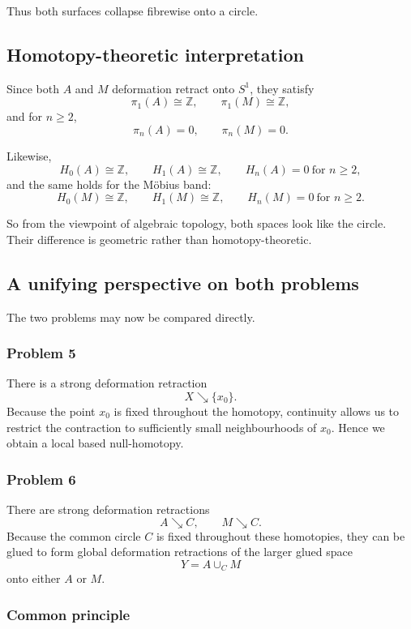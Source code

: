 \documentclass[12pt,a4paper]{article}
\theoremstyle{notespace}
\begin{document}
Thus both surfaces collapse fibrewise onto a circle.

\subsection{Homotopy-theoretic interpretation}

Since both \(A\) and \(M\) deformation retract onto \(S^1\), they satisfy
\[
\pi_1(A)\cong \mathbb{Z},
\qquad
\pi_1(M)\cong \mathbb{Z},
\]
and for \(n\geq 2\),
\[
\pi_n(A)=0,
\qquad
\pi_n(M)=0.
\]

Likewise,
\[
H_0(A)\cong \mathbb{Z},
\qquad
H_1(A)\cong \mathbb{Z},
\qquad
H_n(A)=0\ \text{for }n\geq 2,
\]
and the same holds for the Möbius band:
\[
H_0(M)\cong \mathbb{Z},
\qquad
H_1(M)\cong \mathbb{Z},
\qquad
H_n(M)=0\ \text{for }n\geq 2.
\]

So from the viewpoint of algebraic topology, both spaces look like the circle. Their difference is geometric rather than homotopy-theoretic.

\subsection{A unifying perspective on both problems}

The two problems may now be compared directly.

\subsubsection{Problem 5}

There is a strong deformation retraction
\[
X\searrow \{x_0\}.
\]
Because the point \(x_0\) is fixed throughout the homotopy, continuity allows us to restrict the contraction to sufficiently small neighbourhoods of \(x_0\). Hence we obtain a local based null-homotopy.

\subsubsection{Problem 6}

There are strong deformation retractions
\[
A\searrow C,
\qquad
M\searrow C.
\]
Because the common circle \(C\) is fixed throughout these homotopies, they can be glued to form global deformation retractions of the larger glued space
\[
Y=A\cup_C M
\]
onto either \(A\) or \(M\).

\subsubsection{Common principle}
\end{document}
